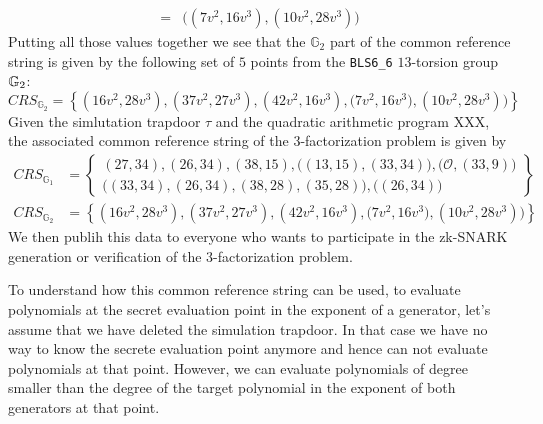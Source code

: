 \begin{example}
\begin{align*}
 = & \Big((7v^2,16v^3),(10v^2,28v^3)\Big)
\end{align*}
Putting all those values together we see that the $\mathbb{G}_2$ part of the common reference string is given by the following set of $5$ points from the \texttt{BLS6\_6} $13$-torsion group $\mathbb{G}_2$:
$$
CRS_{\mathbb{G}_{2}}=\left\{(16v^2,28v^3) ,(37v^2,27v^3),(42v^2,16v^3),\Big(7v^2,16v^3), (10v^2,28v^3)\Big)\right\} 
$$
Given the simlutation trapdoor $\tau$ and the quadratic arithmetic program XXX, the associated common reference string of the $3$-factorization problem is given by
\begin{align*}
CRS_{\mathbb{G}_{1}} &=\left\{ \begin{array}{c}
(27,34),(26,34),(38,15),\Big((13,15),(33,34)\Big),
\Big(\mathcal{O}, (33,9)\Big)\\
\Big((33,34),(26,34),(38,28),(35,28)\Big),
\Big((26,34)\Big)
\end{array}\right\}\\
CRS_{\mathbb{G}_{2}} &=\left\{(16v^2,28v^3) ,(37v^2,27v^3),(42v^2,16v^3),\Big(7v^2,16v^3), (10v^2,28v^3)\Big)\right\}
\end{align*}
We then publih this data to everyone who wants to participate in the zk-SNARK generation or verification of the $3$-factorization problem.

To understand how this common reference string can be used, to evaluate polynomials at the secret evaluation point in the exponent of a generator, let's assume that we have deleted the simulation trapdoor. In that case we have no way to know the secrete evaluation point anymore and hence can not evaluate polynomials at that point. However, we can evaluate polynomials of degree smaller than the degree of the target polynomial in the exponent of both generators at that point. 


\end{example}
